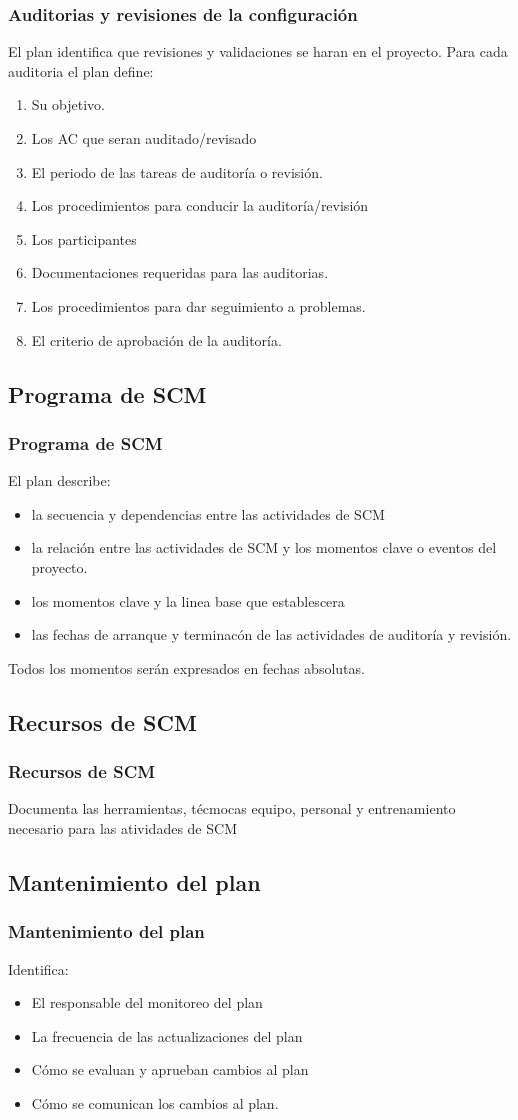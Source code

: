 \begin{frame}
	\frametitle{Auditorias y revisiones de la configuraci\'on}
	El plan identifica que revisiones y validaciones se haran en el 
	proyecto. 
	Para cada auditoria el plan define: 
	\begin{enumerate}
		\item Su objetivo.
		\item Los AC que seran auditado/revisado
		\item El periodo de las tareas de auditor\'ia o revisi\'on.
		\item Los procedimientos para conducir la auditor\'ia/revisi\'on
		\item Los participantes
		\item Documentaciones requeridas para las auditorias. 
		\item Los procedimientos para dar seguimiento a problemas. 
		\item El criterio de aprobaci\'on de la auditor\'ia. 
	\end{enumerate}
\end{frame}
\subsection{Programa de SCM}
\begin{frame}
	\frametitle{Programa de SCM}
	El plan describe:
	\begin{itemize}
		\item la secuencia y dependencias entre las actividades de SCM
		\item la relaci\'on entre las actividades de SCM y los momentos
			clave o eventos del proyecto. 
		\item los momentos clave y la linea base que establescera
		\item las fechas de arranque y terminac\'on de las actividades
			de auditor\'ia y revisi\'on. 
	\end{itemize}
	Todos los momentos ser\'an expresados en fechas absolutas. 
\end{frame}
\subsection{Recursos de SCM}
\begin{frame}
	\frametitle{Recursos de SCM}
	Documenta las herramientas, t\'ecmocas equipo, personal y entrenamiento
	necesario para las atividades de SCM
\end{frame}
\subsection{Mantenimiento del plan}
\begin{frame}
	\frametitle{Mantenimiento del plan}
	Identifica:
	\begin{itemize}
		\item El responsable del monitoreo del plan
		\item La frecuencia de las actualizaciones del plan
		\item C\'omo se evaluan y aprueban cambios al plan
		\item C\'omo se comunican los cambios al plan. 
	\end{itemize}
\end{frame}
